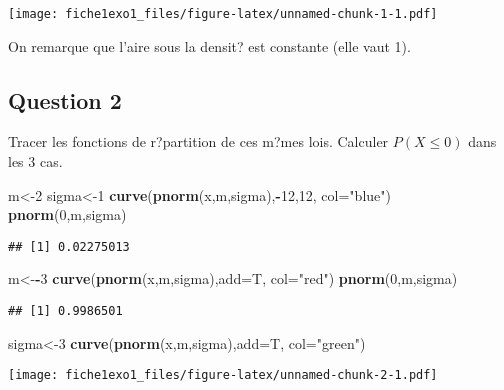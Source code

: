 \documentclass[]{article}
\newenvironment{Shaded}{\begin{snugshade}}{\end{snugshade}}
\newcommand{\DataTypeTok}[1]{\textcolor[rgb]{0.13,0.29,0.53}{#1}}
\newcommand{\DecValTok}[1]{\textcolor[rgb]{0.00,0.00,0.81}{#1}}
\newcommand{\KeywordTok}[1]{\textcolor[rgb]{0.13,0.29,0.53}{\textbf{#1}}}
\newcommand{\NormalTok}[1]{#1}
\newcommand{\OperatorTok}[1]{\textcolor[rgb]{0.81,0.36,0.00}{\textbf{#1}}}
\newcommand{\StringTok}[1]{\textcolor[rgb]{0.31,0.60,0.02}{#1}}
\begin{document}
\texttt{[image: fiche1exo1\_files/figure-latex/unnamed-chunk-1-1.pdf]}

On remarque que l'aire sous la densit? est constante (elle vaut 1).

\hypertarget{question-2}{%
\subsection{Question 2}\label{question-2}}

Tracer les fonctions de r?partition de ces m?mes lois. Calculer
\(P(X \leq 0)\) dans les 3 cas.

\begin{Shaded}
\begin{Highlighting}[]
\NormalTok{m<-}\DecValTok{2}
\NormalTok{sigma<-}\DecValTok{1}
\KeywordTok{curve}\NormalTok{(}\KeywordTok{pnorm}\NormalTok{(x,m,sigma),}\OperatorTok{-}\DecValTok{12}\NormalTok{,}\DecValTok{12}\NormalTok{, }\DataTypeTok{col=}\StringTok{"blue"}\NormalTok{)}
\KeywordTok{pnorm}\NormalTok{(}\DecValTok{0}\NormalTok{,m,sigma)}
\end{Highlighting}
\end{Shaded}

\begin{verbatim}
## [1] 0.02275013
\end{verbatim}

\begin{Shaded}
\begin{Highlighting}[]
\NormalTok{m<-}\OperatorTok{-}\DecValTok{3}
\KeywordTok{curve}\NormalTok{(}\KeywordTok{pnorm}\NormalTok{(x,m,sigma),}\DataTypeTok{add=}\NormalTok{T, }\DataTypeTok{col=}\StringTok{"red"}\NormalTok{)}
\KeywordTok{pnorm}\NormalTok{(}\DecValTok{0}\NormalTok{,m,sigma)}
\end{Highlighting}
\end{Shaded}

\begin{verbatim}
## [1] 0.9986501
\end{verbatim}

\begin{Shaded}
\begin{Highlighting}[]
\NormalTok{sigma<-}\DecValTok{3}
\KeywordTok{curve}\NormalTok{(}\KeywordTok{pnorm}\NormalTok{(x,m,sigma),}\DataTypeTok{add=}\NormalTok{T, }\DataTypeTok{col=}\StringTok{"green"}\NormalTok{)}
\end{Highlighting}
\end{Shaded}

\texttt{[image: fiche1exo1\_files/figure-latex/unnamed-chunk-2-1.pdf]}
\end{document}
